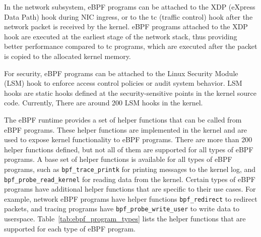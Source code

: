 

In the network subsystem, eBPF programs can be attached to the XDP (eXpress Data Path) hook during NIC ingress,
or to the tc (traffic control) hook after the network packet is received by the kernel.
eBPF programs attached to the XDP hook are executed at the earliest stage of the network stack, thus providing
better performance compared to tc programs, which are executed after the packet is copied to the allocated kernel memory.

For security, eBPF programs can be attached to the Linux Security Module (LSM) hook
to enforce access control policies or audit system behavior.
LSM hooks are static hooks defined at the security-sensitive points in the kernel source code.
Currently, There are around 200 LSM hooks in the kernel.

The eBPF runtime provides a set of helper functions that can be called from eBPF programs.
These helper functions are implemented in the kernel and are used to expose kernel functionality to eBPF programs.
There are more than 200 helper functions defined, but not all of them are supported for all types of eBPF programs.
A base set of helper functions is available for all types of eBPF programs,
such as \texttt{bpf\_trace\_printk} for printing messages to the kernel log,
and \texttt{bpf\_probe\_read\_kernel} for reading data from the kernel.
Certain types of eBPF programs have additional helper functions that are specific to their use cases.
For example, network eBPF programs have helper functions \texttt{bpf\_redirect} to redirect packets, and
tracing programs have \texttt{bpf\_probe\_write\_user} to write data to userspace.
Table~\ref{tab:ebpf_program_types} lists the helper functions that are supported for each type of eBPF program.

